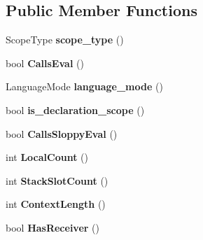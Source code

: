\subsection*{Public Member Functions}
\begin{DoxyCompactItemize}
\item 
Scope\+Type {\bfseries scope\+\_\+type} ()\hypertarget{classv8_1_1internal_1_1_scope_info_ae733615765dcb18d495f47a17f71d20a}{}\label{classv8_1_1internal_1_1_scope_info_ae733615765dcb18d495f47a17f71d20a}

\item 
bool {\bfseries Calls\+Eval} ()\hypertarget{classv8_1_1internal_1_1_scope_info_a432170e24589a5c5f9d1ad5bb1832623}{}\label{classv8_1_1internal_1_1_scope_info_a432170e24589a5c5f9d1ad5bb1832623}

\item 
Language\+Mode {\bfseries language\+\_\+mode} ()\hypertarget{classv8_1_1internal_1_1_scope_info_a1c3515dbe4bb6d991910ecb7a6001042}{}\label{classv8_1_1internal_1_1_scope_info_a1c3515dbe4bb6d991910ecb7a6001042}

\item 
bool {\bfseries is\+\_\+declaration\+\_\+scope} ()\hypertarget{classv8_1_1internal_1_1_scope_info_a2397d242cb007ea6110b0a9fe52f1fdd}{}\label{classv8_1_1internal_1_1_scope_info_a2397d242cb007ea6110b0a9fe52f1fdd}

\item 
bool {\bfseries Calls\+Sloppy\+Eval} ()\hypertarget{classv8_1_1internal_1_1_scope_info_a84ec03d497d0f9fbb97e0f6419c7f8c5}{}\label{classv8_1_1internal_1_1_scope_info_a84ec03d497d0f9fbb97e0f6419c7f8c5}

\item 
int {\bfseries Local\+Count} ()\hypertarget{classv8_1_1internal_1_1_scope_info_a8c5ea06d07d096ba90f9508307aeba96}{}\label{classv8_1_1internal_1_1_scope_info_a8c5ea06d07d096ba90f9508307aeba96}

\item 
int {\bfseries Stack\+Slot\+Count} ()\hypertarget{classv8_1_1internal_1_1_scope_info_a29109c40318ea4adf095f4e295d39a46}{}\label{classv8_1_1internal_1_1_scope_info_a29109c40318ea4adf095f4e295d39a46}

\item 
int {\bfseries Context\+Length} ()\hypertarget{classv8_1_1internal_1_1_scope_info_aef66422f96d9e2414e05178e28dc3220}{}\label{classv8_1_1internal_1_1_scope_info_aef66422f96d9e2414e05178e28dc3220}

\item 
bool {\bfseries Has\+Receiver} ()\hypertarget{classv8_1_1internal_1_1_scope_info_affaa83158ecaa568eb975d78fffebd2e}{}\label{classv8_1_1internal_1_1_scope_info_affaa83158ecaa568eb975d78fffebd2e}


\end{DoxyCompactItemize}

